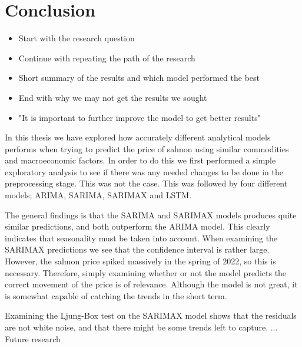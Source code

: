 \section{Conclusion}
\begin{itemize}
    \item Start with the research question
    \item Continue with repeating the path of the research
    \item Short summary of the results and which model performed the best
    \item End with why we may not get the results we sought
    \item "It is important to further improve the model to get better results"
\end{itemize}

In this thesis we have explored how accurately different analytical models performs when trying to predict the price of salmon using similar commodities and macroeconomic factors. In order to do this we first performed a simple exploratory analysis to see if there was any needed changes to be done in the preprocessing stage. This was not the case. This was followed by four different models; ARIMA, SARIMA, SARIMAX and LSTM. 

The general findings is that the SARIMA and SARIMAX models produces quite similar predictions, and both outperform the ARIMA model. This clearly indicates that seasonality must be taken into account. When examining the SARIMAX predictions we see that the confidence interval is rather large. However, the salmon price spiked massively in the spring of 2022, so this is necessary. Therefore, simply examining whether or not the model predicts the correct movement of the price is of relevance. Although the model is not great, it is somewhat capable of catching the trends in the short term. 

Examining the Ljung-Box test on the SARIMAX model shows that the residuals are not white noise, and that there might be some trends left to capture. ... Future research
